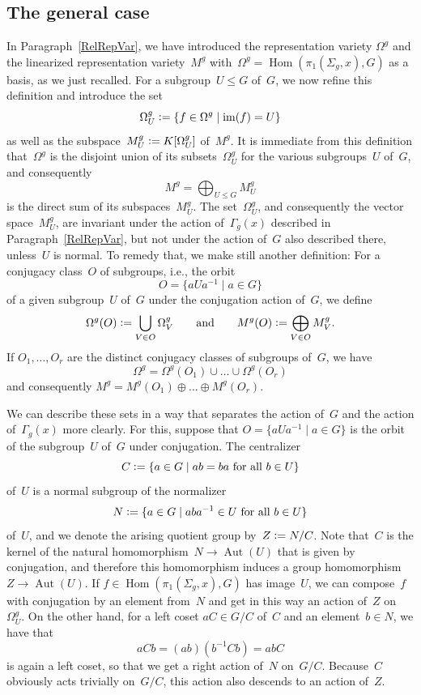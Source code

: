 \documentclass[12pt]{article}
\theoremstyle{definition}
\theoremstyle{break}
\DeclareMathOperator\Hom{Hom}
\DeclareMathOperator\Aut{Aut}
\DeclareMathOperator\im{im}
\renewcommand{\1}{\mathbbm{1}}
\newcommand{\deq}{\vcentcolon =}
\begin{document}
\subsection{The general case} \label{GenCase}
In Paragraph~\ref{RelRepVar}, we have introduced the representation variety $\Omega^g$ and the linearized representation variety~$M^g$ with~$\Omega^g = \Hom(\pi_1(\Sigma_g,x),G)$ as a basis, as we just recalled. For a subgroup~$U \le G$ of~$G$, we now refine this definition and introduce the set
\[\Omega^{g}_U \deq \{f \in \Omega^g \mid \im(f) = U \}\]
as well as the subspace~$M^g_U \deq K[\Omega^{g}_U]$ of~$M^g$. It is immediate from this definition that~$\Omega^g$ is the disjoint union of its subsets~$\Omega^{g}_U$ for the various subgroups~$U$ of~$G$, and consequently
\[M^g =\bigoplus_{U \le G} M^g_U\]
is the direct sum of its subspaces~$M^g_U$. The set~$\Omega^{g}_U$, and consequently the vector space~$M^g_U$, are invariant under the action of~$\Gamma_{g}(x)$ described in Paragraph~\ref{RelRepVar}, but not under the action of~$G$ also described there, unless~$U$ is normal. To remedy that, we make still another definition: For a conjugacy class~$O$ of subgroups, i.e., the orbit
\[O = \{a U a^{-1} \mid a \in G \}\]
of a given subgroup~$U$ of~$G$ under the conjugation action of~$G$, we define
\[\Omega^{g}(O) \deq \bigcup_{V \in O} \Omega^{g}_V
\qquad \text{and} \qquad
M^g(O) \deq \bigoplus_{V \in O} M^g_V.\]
If $O_1,\dots,O_r$ are the distinct conjugacy classes of subgroups of~$G$, we have
\[\Omega^{g} = \Omega^{g}(O_1) \cup \dots \cup \Omega^{g}(O_r)\]
and consequently
$M^{g} = M^{g}(O_1) \oplus \dots \oplus M^{g}(O_r)$.

We can describe these sets in a way that separates the action of~$G$ and the action of~$\Gamma_{g}(x)$ more clearly. For this, suppose that $O = \{a U a^{-1} \mid a \in G \}$ is the orbit of the subgroup~$U$ of~$G$ under conjugation. The centralizer
\[C \deq \{a \in G \mid ab = ba \text{ for all } b \in U\}\]
of~$U$ is a normal subgroup of the normalizer
\[N \deq \{a \in G \mid aba^{-1} \in U \text{ for all } b \in U\}\]
of~$U$, and we denote the arising quotient group by~$Z \deq N/C$. Note that~$C$ is the kernel of the natural homomorphism~$N \to \Aut(U)$ that is given by conjugation, and therefore this homomorphism induces a group homomorphism~$Z \to \Aut(U)$. If $f \in \Hom(\pi_1(\Sigma_g,x),G)$ has image~$U$, we can compose~$f$ with conjugation by an element from~$N$ and get in this way an action of~$Z$ on~$\Omega_U^{g}$. On the other hand, for a left coset $aC \in G/C$ of~$C$ and an element~$b \in N$, we have that
\[aCb = (ab) (b^{-1} C b) = abC\]
is again a left coset, so that we get a right action of~$N$ on~$G/C$. Because~$C$ obviously acts trivially on~$G/C$, this action also descends to an action of~$Z$.
\end{document}
